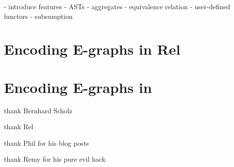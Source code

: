 - introduce features
    - ASTs
    - aggregates
    - equivalence relation
    - user-defined functors
    - subsumption




\section{Encoding E-graphs in Rel}

\section{Encoding E-graphs in }

thank Bernhard Scholz

thank Rel

thank Phil for his blog posts

thank Remy for his pure evil hack
